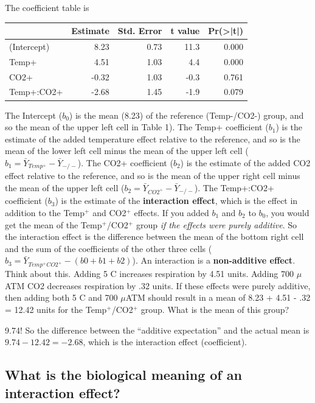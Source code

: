 \documentclass[]{book}
\theoremstyle{definition}
\theoremstyle{definition}
\theoremstyle{definition}
\theoremstyle{remark}
\begin{document}
The coefficient table is

\begin{tabular}{l|r|r|r|r}
\hline
  & Estimate & Std. Error & t value & Pr(>|t|)\\
\hline
(Intercept) & 8.23 & 0.73 & 11.3 & 0.000\\
\hline
Temp+ & 4.51 & 1.03 & 4.4 & 0.000\\
\hline
CO2+ & -0.32 & 1.03 & -0.3 & 0.761\\
\hline
Temp+:CO2+ & -2.68 & 1.45 & -1.9 & 0.079\\
\hline
\end{tabular}

The Intercept (\(b_0\)) is the mean (8.23) of the reference (Temp-/CO2-)
group, and so the mean of the upper left cell in Table 1). The Temp+
coefficient (\(b_1\)) is the estimate of the added temperature effect
relative to the reference, and so is the mean of the lower left cell
minus the mean of the upper left cell
(\(b_1=\bar{Y}_{Temp^+}-\bar{Y}_{-/-}\)). The CO2+ coefficient (\(b_2\))
is the estimate of the added CO2 effect relative to the reference, and
so is the mean of the upper right cell minus the mean of the upper left
cell (\(b_2=\bar{Y}_{CO2^+}-\bar{Y}_{-/-}\)). The Temp+:CO2+ coefficient
(\(b_3\)) is the estimate of the \textbf{interaction effect}, which is
the effect in addition to the Temp\(^+\) and CO2\(^+\) effects. If you
added \(b_1\) and \(b_2\) to \(b_0\), you would get the mean of the
Temp\(^+\)/CO2\(^+\) group \emph{if the effects were purely additive}.
So the interaction effect is the difference between the mean of the
bottom right cell and the sum of the coefficients of the other three
cells (\(b_3 = \bar{Y}_{Temp^+CO2^+} - (b0 + b1 + b2)\)). An interaction
is a \textbf{non-additive effect}. Think about this. Adding 5 C
increases respiration by 4.51 units. Adding 700 \(\mu\)ATM CO2 decreases
respiration by .32 units. If these effects were purely additive, then
adding both 5 C and 700 \(\mu\)ATM should result in a mean of 8.23 +
4.51 - .32 = 12.42 units for the Temp\(^+\)/CO2\(^+\) group. What is the
mean of this group?

9.74! So the difference between the ``additive expectation'' and the
actual mean is \(9.74 - 12.42 = -2.68\), which is the interaction effect
(coefficient).

\subsection{What is the biological meaning of an interaction
effect?}\label{what-is-the-biological-meaning-of-an-interaction-effect}
\end{document}
